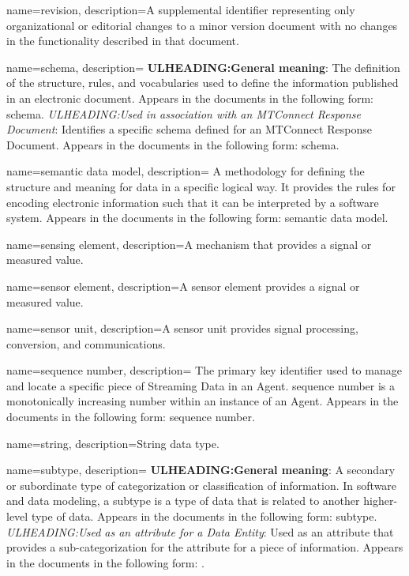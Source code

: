 {
    name={revision},
	description={A supplemental identifier representing only organizational or editorial changes to a \gls{minor} version document with no changes in the functionality described in that document.}
}

{
    name={schema},
	description={
	\textbf{ULHEADING:General meaning}:
	The definition of the structure, rules, and vocabularies used to define the information published in an electronic document.
	Appears in the documents in the following form: schema.
	\textit{ULHEADING:Used in association with an \gls{MTConnect Response Document}}:
	Identifies a specific schema defined for an \gls{MTConnect Response Document}.
	Appears in the documents in the following form: \gls{schema}.
}
}

{
    name={semantic data model},
	description={
	A methodology for defining the structure and meaning for data in a specific logical way.  
	It provides the rules for encoding electronic information such that it can be interpreted by a software system.  
	Appears in the documents in the following form: \gls{semantic data model}.
}
}

{
    name={sensing element},
	description={A mechanism that provides a signal or measured value.}
}

{
    name={sensor element},
	description={A \gls{sensor element} provides a signal or measured value.}
}

{
    name={sensor unit},
	description={A \gls{sensor unit} provides signal processing, conversion, and communications.}
}

{
    name={sequence number},
	description={
	The primary key identifier used to manage and locate a specific piece of \gls{Streaming Data} in an \gls{Agent}.
	\gls{sequence number} is a monotonically increasing number within an instance of an \gls{Agent}.
	Appears in the documents in the following form: \gls{sequence number}.
}
}

{
    name={string},
	description={String data type.}
}

{
    name={subtype},
	description={
	\textbf{ULHEADING:General meaning}:
	A secondary or subordinate type of categorization or classification of information.
	In software and data modeling, a subtype is a type of data that is related to another higher-level type of data.
	Appears in the documents in the following form: subtype.
	\textit{ULHEADING:Used as an attribute for a \gls{Data Entity}}:
	Used as an attribute that provides a sub-categorization for the  attribute for a piece of information.
	Appears in the documents in the following form: .
}
}

